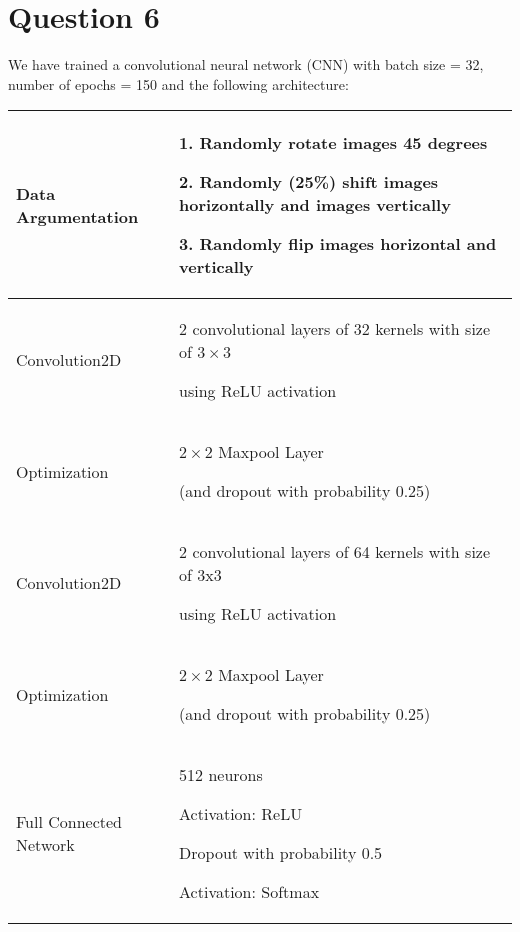 \documentclass[12pt, a4paper]{article}
\begin{document}
\section*{Question 6}

We have trained a convolutional neural network (CNN) with batch size = 32, number of epochs = 150 and the following architecture:
\begin{center}
\begin{tabular} { C{4cm} | L{12cm} }
    Data Argumentation & 1. Randomly rotate images 45 degrees\par
    2. Randomly (25\%) shift images horizontally and images vertically\par
    3. Randomly flip images horizontal and vertically \\ \hline

    Convolution2D & 2 convolutional layers of 32 kernels with size of $3 \times 3$\par
    using ReLU activation \\ \hline

    Optimization & $2 \times 2$ Maxpool Layer\par
    (and dropout with probability 0.25) \\ \hline

    Convolution2D & 2 convolutional layers of 64 kernels with size of 3x3\par
    using ReLU activation \\ \hline

    Optimization & $2 \times 2$ Maxpool Layer\par
    (and dropout with probability 0.25) \\ \hline

    Full Connected Network & 512 neurons\par
    Activation: ReLU\par
    Dropout with probability 0.5\par
    Activation: Softmax \\
\end{tabular}
\end{center}
\end{document}
